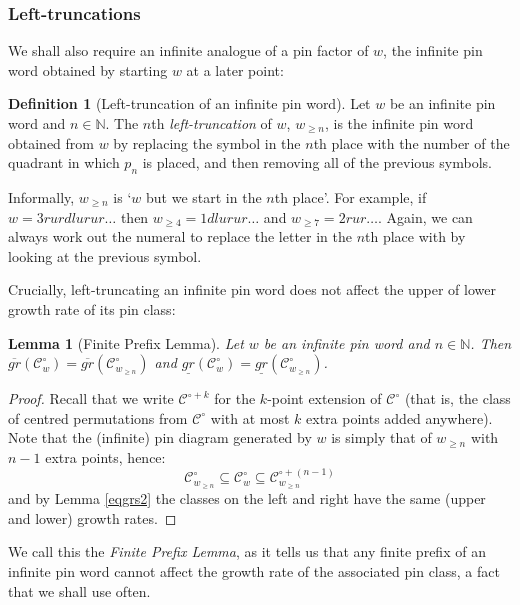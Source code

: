 \documentclass[11pt,a4paper]{article}
\newtheorem{lemma}[thm]{Lemma}
\theoremstyle{definition}
\newtheorem{defn}[thm]{Definition}
\begin{document}
\subsubsection*{Left-truncations}

We shall also require an infinite analogue of a pin factor of $w$, the infinite pin word obtained by starting $w$ at a later point:

\begin{defn}[Left-truncation of an infinite pin word]
Let $w$ be an infinite pin word and $n \in \mathbb{N}$. The $n$th \emph{left-truncation} of $w$, $w_{\geq n}$, is the infinite pin word obtained from $w$ by replacing the symbol in the $n$th place with the number of the quadrant in which $p_{n}$ is placed, and then removing all of the previous symbols.
\end{defn} 

Informally, $w_{\geq n}$ is `$w$ but we start in the $n$th place'. For example, if $w = 3rurdlurur\dots$ then $w_{\geq 4} = 1dlurur\dots$ and $w_{\geq 7} = 2rur\dots$. Again, we can always work out the numeral to replace the letter in the $n$th place with by looking at the previous symbol.

Crucially, left-truncating an infinite pin word does not affect the upper of lower growth rate of its pin class:

\begin{lemma}[Finite Prefix Lemma] \label{fplem}
Let $w$ be an infinite pin word and $n \in \mathbb{N}$. Then $\overline{gr}(\mathcal{C}^{\circ}_{w}) = \overline{gr}(\mathcal{C}^{\circ}_{w_{\geq n}})$ and $\underline{gr}(\mathcal{C}^{\circ}_{w}) = \underline{gr}(\mathcal{C}^{\circ}_{w_{\geq n}})$.
\end{lemma}

\begin{proof}
Recall that we write $\mathcal{C}^{\circ+k}$ for the $k$-point extension of $\mathcal{C}^{\circ}$ (that is, the class of centred permutations from $\mathcal{C}^{\circ}$ with at most $k$ extra points added anywhere). Note that the (infinite) pin diagram generated by $w$ is simply that of $w_{\geq n}$ with $n-1$ extra points, hence:
\[
\mathcal{C}^{\circ}_{w_{\geq n}} \subseteq \mathcal{C}^{\circ}_{w} \subseteq \mathcal{C}^{\circ+(n-1)}_{w_{\geq n}}
\]
and by Lemma \ref{eqgrs2} the classes on the left and right have the same (upper and lower) growth rates.
\end{proof}

We call this the \emph{Finite Prefix Lemma}, as it tells us that any finite prefix of an infinite pin word cannot affect the growth rate of the associated pin class, a fact that we shall use often.
\end{document}
